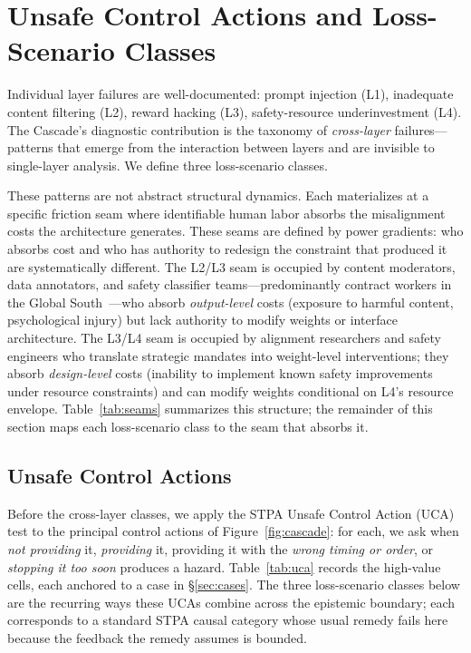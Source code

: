 \section{Unsafe Control Actions and Loss-Scenario Classes}\label{sec:patterns}

Individual layer failures are well-documented: prompt injection (L1), inadequate content filtering (L2), reward hacking (L3), safety-resource underinvestment (L4). The Cascade's diagnostic contribution is the taxonomy of \textit{cross-layer} failures---patterns that emerge from the interaction between layers and are invisible to single-layer analysis. We define three loss-scenario classes.

These patterns are not abstract structural dynamics. Each materializes at a specific friction seam where identifiable human labor absorbs the misalignment costs the architecture generates. These seams are defined by power gradients: who absorbs cost and who has authority to redesign the constraint that produced it are systematically different. The L2/L3 seam is occupied by content moderators, data annotators, and safety classifier teams---predominantly contract workers in the Global South~\cite{cnn2024moderators, equidem2025ihrb}---who absorb \textit{output-level} costs (exposure to harmful content, psychological injury) but lack authority to modify weights or interface architecture. The L3/L4 seam is occupied by alignment researchers and safety engineers who translate strategic mandates into weight-level interventions; they absorb \textit{design-level} costs (inability to implement known safety improvements under resource constraints) and can modify weights conditional on L4's resource envelope. Table~\ref{tab:seams} summarizes this structure; the remainder of this section maps each loss-scenario class to the seam that absorbs it.

\subsection{Unsafe Control Actions}\label{sec:uca}

Before the cross-layer classes, we apply the STPA Unsafe Control Action (UCA) test to the principal control actions of Figure~\ref{fig:cascade}: for each, we ask when \emph{not providing} it, \emph{providing} it, providing it with the \emph{wrong timing or order}, or \emph{stopping it too soon} produces a hazard. Table~\ref{tab:uca} records the high-value cells, each anchored to a case in \S\ref{sec:cases}. The three loss-scenario classes below are the recurring ways these UCAs combine across the epistemic boundary; each corresponds to a standard STPA causal category whose usual remedy fails here because the feedback the remedy assumes is bounded.

